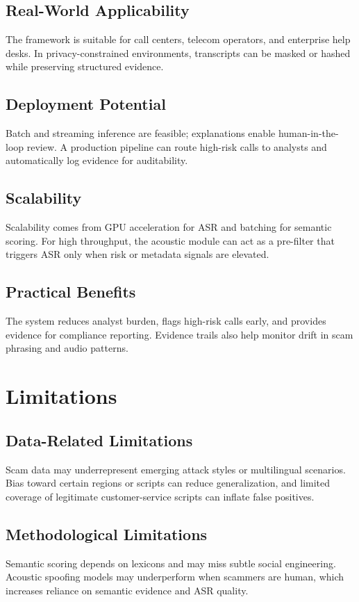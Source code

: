 \documentclass[11pt,a4paper]{article}
\begin{document}
\subsection{Real-World Applicability}
The framework is suitable for call centers, telecom operators, and enterprise help desks. In privacy-constrained environments, transcripts can be masked or hashed while preserving structured evidence.

\subsection{Deployment Potential}
Batch and streaming inference are feasible; explanations enable human-in-the-loop review. A production pipeline can route high-risk calls to analysts and automatically log evidence for auditability.

\subsection{Scalability}
Scalability comes from GPU acceleration for ASR and batching for semantic scoring. For high throughput, the acoustic module can act as a pre-filter that triggers ASR only when risk or metadata signals are elevated.

\subsection{Practical Benefits}
The system reduces analyst burden, flags high-risk calls early, and provides evidence for compliance reporting. Evidence trails also help monitor drift in scam phrasing and audio patterns.

\section{Limitations}
\subsection{Data-Related Limitations}
Scam data may underrepresent emerging attack styles or multilingual scenarios. Bias toward certain regions or scripts can reduce generalization, and limited coverage of legitimate customer-service scripts can inflate false positives.

\subsection{Methodological Limitations}
Semantic scoring depends on lexicons and may miss subtle social engineering. Acoustic spoofing models may underperform when scammers are human, which increases reliance on semantic evidence and ASR quality.
\end{document}
